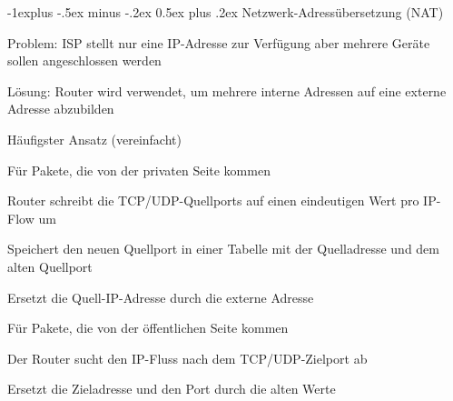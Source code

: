 \documentclass[a4paper]{article}
\makeatletter
\renewcommand{\subsection}{\@startsection{subsection}{2}{0mm}%
 {-1explus -.5ex minus -.2ex}%
 {0.5ex plus .2ex}%
 {\normalfont\normalsize\bfseries}}
\renewcommand{\subsubsection}{\@startsection{subsubsection}{3}{0mm}%
 {-1ex plus -.5ex minus -.2ex}%
 {1ex plus .2ex}%
 {\normalfont\small\bfseries}}
\makeatother
\begin{document}
\begin{multicols}{3}
      \subsection{Netzwerk-Adressübersetzung (NAT)}
      \begin{itemize*}
            \item Problem: ISP stellt nur eine IP-Adresse zur Verfügung aber mehrere Geräte sollen angeschlossen werden
            \item Lösung: Router wird verwendet, um mehrere interne Adressen auf eine externe Adresse abzubilden
            \item Häufigster Ansatz (vereinfacht)
            \item Für Pakete, die von der privaten Seite kommen
            \begin{itemize*}
                  \item Router schreibt die TCP/UDP-Quellports auf einen eindeutigen Wert pro IP-Flow um
                  \item Speichert den neuen Quellport in einer Tabelle mit der Quelladresse und dem alten Quellport
                  \item Ersetzt die Quell-IP-Adresse durch die externe Adresse
            \end{itemize*}
            \item Für Pakete, die von der öffentlichen Seite kommen
            \begin{itemize*}
                  \item Der Router sucht den IP-Fluss nach dem TCP/UDP-Zielport ab
                  \item Ersetzt die Zieladresse und den Port durch die alten Werte
            \end{itemize*}
      \end{itemize*}



\end{multicols}
\end{document}
